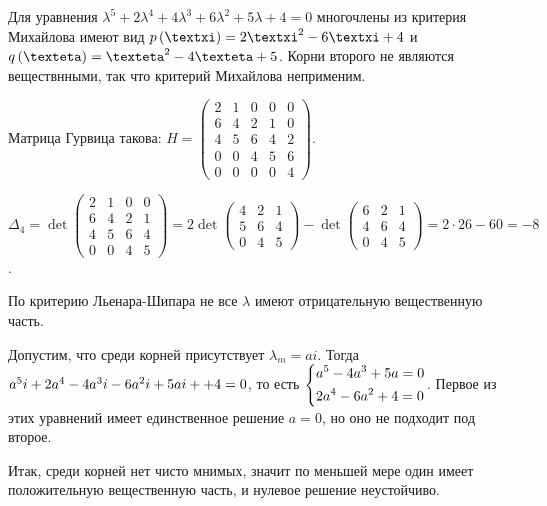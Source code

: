 \documentclass[a5paper,10pt]{article}
\begin{document}
Для уравнения $\lambda^5 + 2\lambda^4 + 4\lambda^3 + 6\lambda^2 + 5\lambda + 4 = 0$ многочлены из критерия Михайлова имеют вид $p\br{\xi} = 2\xi^2 - 6\xi + 4$ и $q\br{\eta} = \eta^2 - 4\eta + 5$. Корни второго не являются веществнными, так что критерий Михайлова неприменим.

Матрица Гурвица такова:
$H = \begin{pmatrix}
2 & 1 & 0 & 0 & 0
\\ 6 & 4 & 2 & 1 & 0
\\ 4 & 5 & 6 & 4 & 2 
\\ 0 & 0 & 4 & 5 & 6
\\ 0 & 0 & 0 & 0 & 4
\end{pmatrix}$.

$\Delta_{4} = \det\begin{pmatrix}
2 & 1 & 0 & 0 
\\ 6 & 4 & 2 & 1
\\ 4 & 5 & 6 & 4
\\ 0 & 0 & 4 & 5
\end{pmatrix} 
= 2 \det \begin{pmatrix}
4 & 2 & 1
\\ 5 & 6 & 4
\\ 0 & 4 & 5
\end{pmatrix}
-\det \begin{pmatrix}
6 & 2 & 1
\\ 4 & 6 & 4
\\ 0 & 4 & 5
\end{pmatrix}
= 2 \cdot 26 - 60 = -8$.

По критерию Льенара-Шипара не все $\lambda$ имеют отрицательную вещественную часть.

Допустим, что среди корней присутствует $\lambda_{m} = ai$. Тогда $a^5 i + 2a^4 - 4a^3 i - 6a^2 i + 5ai + \linebreak + 4 = 0$, то есть $\left\{ \begin{aligned}& a^5 - 4a^3 + 5a = 0 \\& 2a^4 - 6a^2 + 4 = 0\end{aligned} \right.$. Первое из этих уравнений имеет единственное решение $a = 0$, но оно не подходит под второе.

Итак, среди корней нет чисто мнимых, значит по меньшей мере один имеет положительную вещественную часть, и нулевое решение неустойчиво.
\end{document}
